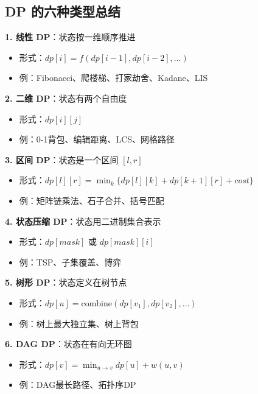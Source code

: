 \documentclass[12pt, a4paper]{ctexart}
\begin{document}
\subsection{DP 的六种类型总结}

\begin{keypoint}[DP 类型分类]

\textbf{1. 线性 DP}：状态按一维顺序推进
\begin{itemize}
    \item 形式：$dp[i] = f(dp[i-1], dp[i-2], \ldots)$
    \item 例：Fibonacci、爬楼梯、打家劫舍、Kadane、LIS
\end{itemize}

\textbf{2. 二维 DP}：状态有两个自由度
\begin{itemize}
    \item 形式：$dp[i][j]$
    \item 例：0-1背包、编辑距离、LCS、网格路径
\end{itemize}

\textbf{3. 区间 DP}：状态是一个区间 $[l, r]$
\begin{itemize}
    \item 形式：$dp[l][r] = \min_k \{dp[l][k] + dp[k+1][r] + cost\}$
    \item 例：矩阵链乘法、石子合并、括号匹配
\end{itemize}

\textbf{4. 状态压缩 DP}：状态用二进制集合表示
\begin{itemize}
    \item 形式：$dp[mask]$ 或 $dp[mask][i]$
    \item 例：TSP、子集覆盖、博弈
\end{itemize}

\textbf{5. 树形 DP}：状态定义在树节点
\begin{itemize}
    \item 形式：$dp[u] = \text{combine}(dp[v_1], dp[v_2], \ldots)$
    \item 例：树上最大独立集、树上背包
\end{itemize}

\textbf{6. DAG DP}：状态在有向无环图
\begin{itemize}
    \item 形式：$dp[v] = \min_{u \to v} dp[u] + w(u,v)$
    \item 例：DAG最长路径、拓扑序DP
\end{itemize}

\end{keypoint}
\end{document}

